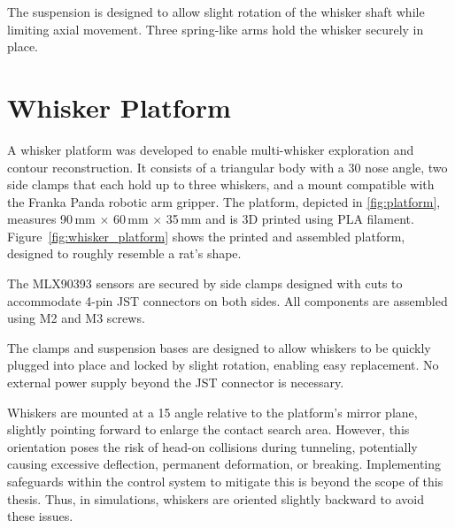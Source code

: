 The suspension is designed to allow slight rotation of the whisker shaft while limiting axial movement.
Three spring-like arms hold the whisker securely in place.


\section{Whisker Platform}

A whisker platform was developed to enable multi-whisker exploration and contour reconstruction.
It consists of a triangular body with a 30\degree{} nose angle, two side clamps that each hold up to three whiskers, and a mount compatible with the Franka Panda robotic arm gripper.
The platform, depicted in \cref{fig:platform}, measures 90\,mm $\times$ 60\,mm $\times$ 35\,mm and is 3D printed using PLA filament.
Figure~\ref{fig:whisker_platform} shows the printed and assembled platform, designed to roughly resemble a rat’s shape.

The MLX90393 sensors are secured by side clamps designed with cuts to accommodate 4-pin JST connectors on both sides.
All components are assembled using M2 and M3 screws.

The clamps and suspension bases are designed to allow whiskers to be quickly plugged into place and locked by slight rotation, enabling easy replacement.
No external power supply beyond the JST connector is necessary.

Whiskers are mounted at a 15\degree{} angle relative to the platform’s mirror plane, slightly pointing forward to enlarge the contact search area.
However, this orientation poses the risk of head-on collisions during tunneling, potentially causing excessive deflection, permanent deformation, or breaking.
Implementing safeguards within the control system to mitigate this is beyond the scope of this thesis.
Thus, in simulations, whiskers are oriented slightly backward to avoid these issues.

